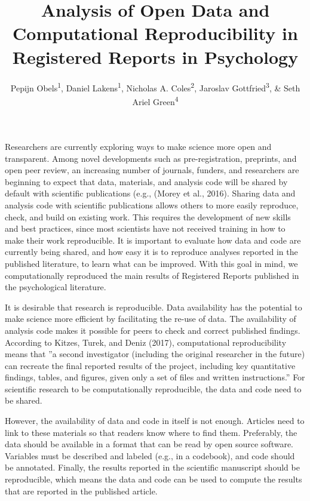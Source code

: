 \documentclass[,jou, a4paper,floatsintext]{apa6}
\title{Analysis of Open Data and Computational Reproducibility in Registered Reports in Psychology}
\author{Pepijn Obels\textsuperscript{1}, Daniel Lakens\textsuperscript{1}, Nicholas A. Coles\textsuperscript{2}, Jaroslav Gottfried\textsuperscript{3}, \& Seth Ariel Green\textsuperscript{4}}
\date{}
\affiliation{
\vspace{0.5cm}
\textsuperscript{1} Eindhoven University of Technology, The Netherlands\\\textsuperscript{2} University of Tennessee, Knoxville, USA\\\textsuperscript{3} Masaryk University, Brno, Czech Republic\\\textsuperscript{4} Code Ocean, New York, USA}
\begin{document}
\maketitle

Researchers are currently exploring ways to make science more open and transparent. Among novel developments such as pre-registration, preprints, and open peer review, an increasing number of journals, funders, and researchers are beginning to expect that data, materials, and analysis code will be shared by default with scientific publications (e.g., (Morey et al., 2016). Sharing data and analysis code with scientific publications allows others to more easily reproduce, check, and build on existing work. This requires the development of new skills and best practices, since most scientists have not received training in how to make their work reproducible. It is important to evaluate how data and code are currently being shared, and how easy it is to reproduce analyses reported in the published literature, to learn what can be improved. With this goal in mind, we computationally reproduced the main results of Registered Reports published in the psychological literature.

It is desirable that research is reproducible. Data availability has the potential to make science more efficient by facilitating the re-use of data. The availability of analysis code makes it possible for peers to check and correct published findings. According to Kitzes, Turek, and Deniz (2017), computational reproducibility means that ''a second investigator (including the original researcher in the future) can recreate the final reported results of the project, including key quantitative findings, tables, and figures, given only a set of files and written instructions.'' For scientific research to be computationally reproducible, the data and code need to be shared.

However, the availability of data and code in itself is not enough. Articles need to link to these materials so that readers know where to find them. Preferably, the data should be available in a format that can be read by open source software. Variables must be described and labeled (e.g., in a codebook), and code should be annotated. Finally, the results reported in the scientific manuscript should be reproducible, which means the data and code can be used to compute the results that are reported in the published article.
\end{document}
